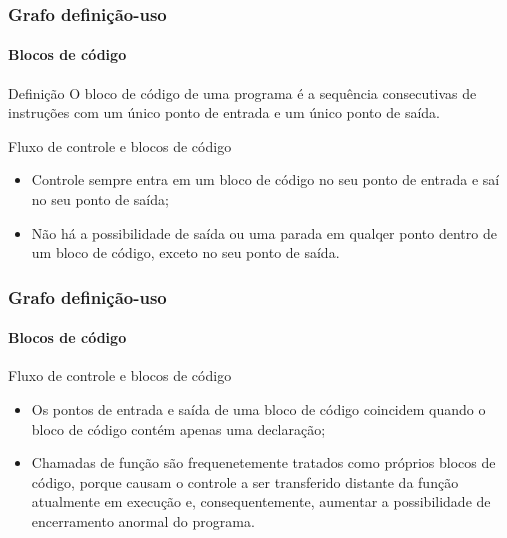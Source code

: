 \begin{frame}
\frametitle{Grafo definição-uso}
\framesubtitle{Blocos de código}
\label{concept:statement}
\label{concept:statement-block}
\label{concept:code-block}

\begin{block:concept}{Definição}
O bloco de código de uma programa é a sequência consecutivas de instruções com um único ponto de entrada e um único ponto de saída.
\end{block:concept}

\begin{block:fact}{Fluxo de controle e blocos de código}
\begin{itemize}
	\item Controle sempre entra em um bloco de código no seu ponto de entrada e saí no seu ponto de saída;

	\item Não há a possibilidade de saída ou uma parada em qualqer ponto dentro de um bloco de código, exceto no seu ponto de saída. 
\end{itemize}
\end{block:fact}
\end{frame}


\begin{frame}
\frametitle{Grafo definição-uso}
\framesubtitle{Blocos de código}

\begin{block:fact}{Fluxo de controle e blocos de código}
\begin{itemize}
	\item Os pontos de entrada e saída de uma bloco de código coincidem quando o bloco de código contém apenas uma declaração;

	\item Chamadas de função são frequenetemente tratados como próprios blocos de código, porque causam o controle a ser transferido distante da função atualmente em execução e, consequentemente, aumentar a possibilidade de encerramento anormal do programa.
\end{itemize}
\end{block:fact}
\end{frame}


